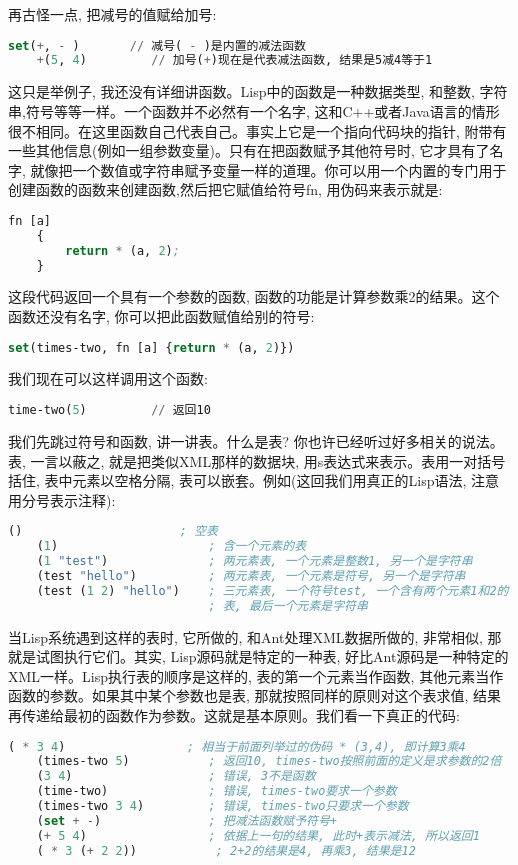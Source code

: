 \documentclass[10pt]{article}
\begin{document}
再古怪一点, 把减号的值赋给加号:
\begin{lstlisting}[language=lisp]
    set(+, - )       // 减号( - )是内置的减法函数
    +(5, 4)         // 加号(+)现在是代表减法函数, 结果是5减4等于1
\end{lstlisting}

这只是举例子, 我还没有详细讲函数。Lisp中的函数是一种数据类型, 和整数, 字符串,符号等等一样。一个函数并不必然有一个名字, 这和C++或者Java语言的情形很不相同。在这里函数自己代表自己。事实上它是一个指向代码块的指针, 附带有一些其他信息(例如一组参数变量)。只有在把函数赋予其他符号时, 它才具有了名字, 就像把一个数值或字符串赋予变量一样的道理。你可以用一个内置的专门用于创建函数的函数来创建函数,然后把它赋值给符号fn, 用伪码来表示就是:
\begin{lstlisting}[language=lisp]
    fn [a]
    {
        return * (a, 2);
    }
\end{lstlisting}

这段代码返回一个具有一个参数的函数, 函数的功能是计算参数乘2的结果。这个函数还没有名字, 你可以把此函数赋值给别的符号:
\begin{lstlisting}[language=lisp]
    set(times-two, fn [a] {return * (a, 2)})
\end{lstlisting}

我们现在可以这样调用这个函数:
\begin{lstlisting}[language=lisp]
    time-two(5)         // 返回10
\end{lstlisting}

我们先跳过符号和函数, 讲一讲表。什么是表? 你也许已经听过好多相关的说法。表, 一言以蔽之, 就是把类似XML那样的数据块, 用s表达式来表示。表用一对括号括住, 表中元素以空格分隔, 表可以嵌套。例如(这回我们用真正的Lisp语法, 注意用分号表示注释):
\begin{lstlisting}[language=lisp]
    ()                      ; 空表
    (1)                     ; 含一个元素的表
    (1 "test")              ; 两元素表, 一个元素是整数1, 另一个是字符串
    (test "hello")          ; 两元素表, 一个元素是符号, 另一个是字符串
    (test (1 2) "hello")    ; 三元素表, 一个符号test, 一个含有两个元素1和2的
                            ; 表, 最后一个元素是字符串
\end{lstlisting}

当Lisp系统遇到这样的表时, 它所做的, 和Ant处理XML数据所做的, 非常相似, 那就是试图执行它们。其实, Lisp源码就是特定的一种表, 好比Ant源码是一种特定的XML一样。Lisp执行表的顺序是这样的, 表的第一个元素当作函数, 其他元素当作函数的参数。如果其中某个参数也是表, 那就按照同样的原则对这个表求值, 结果再传递给最初的函数作为参数。这就是基本原则。我们看一下真正的代码:
\begin{lstlisting}[language=lisp]
    ( * 3 4)                 ; 相当于前面列举过的伪码 * (3,4), 即计算3乘4
    (times-two 5)           ; 返回10, times-two按照前面的定义是求参数的2倍
    (3 4)                   ; 错误, 3不是函数
    (time-two)              ; 错误, times-two要求一个参数
    (times-two 3 4)         ; 错误, times-two只要求一个参数
    (set + -)               ; 把减法函数赋予符号+
    (+ 5 4)                 ; 依据上一句的结果, 此时+表示减法, 所以返回1
    ( * 3 (+ 2 2))           ; 2+2的结果是4, 再乘3, 结果是12
\end{lstlisting}
\end{document}

